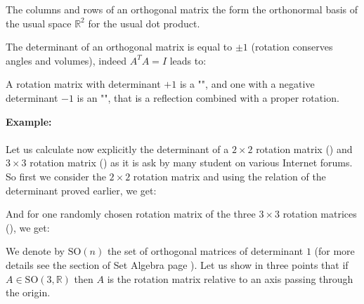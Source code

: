 	The columns and rows of an orthogonal matrix the form the orthonormal basis of the usual space $\mathbb{R}^2$ for the usual dot product.
	
	The determinant of an orthogonal matrix is equal to $\pm 1$ (rotation conserves angles and volumes), indeed $A^T A=I$  leads to:
	
	A rotation matrix with determinant $+1$ is a "", and one with a negative determinant $-1$ is an "", that is a reflection combined with a proper rotation.
	
	\pagebreak
	\begin{tcolorbox}[colframe=black,colback=white,sharp corners]
	\textbf{{\Large {}}Example:}\\\\
	Let us calculate now explicitly the determinant of a $2\times 2$ rotation matrix () and $3\times 3$ rotation matrix () as it is ask by many student on various Internet forums.\\

	So first we consider the $2\times 2$ rotation matrix and using the relation of the determinant proved earlier, we get:
	
	And for one randomly chosen rotation matrix of the three $3\times 3$ rotation matrices (), we get:
		
	\end{tcolorbox}
	
	We denote by $\text{SO}(n)$ the set of orthogonal matrices of determinant $1$ (for more details see the section of Set Algebra page \pageref{set algebra}). Let us show in three points that if $A\in \text{SO}(3,\mathbb{R})$  then $A$ is the rotation matrix relative to an axis passing through the origin.
	
